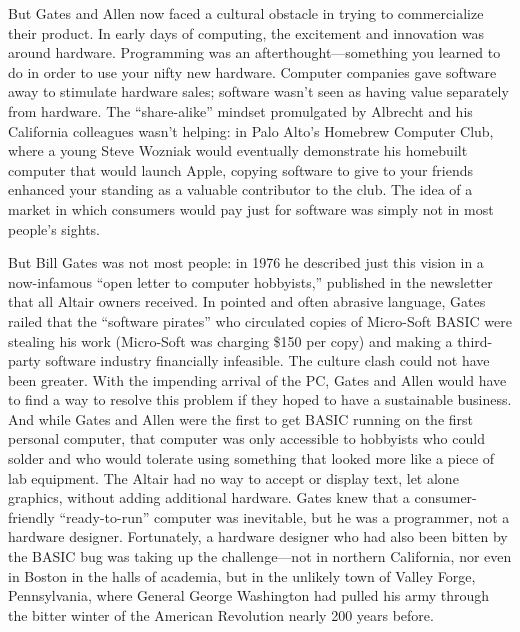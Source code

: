 But Gates and Allen now faced a cultural obstacle in trying to
commercialize their product.
In early days of computing, the excitement and innovation was around
hardware.
Programming was an afterthought---something you learned to do in order
to use your nifty new hardware.
Computer companies gave software away
to stimulate hardware sales; software wasn't seen as having 
value separately from hardware.
The ``share-alike'' mindset promulgated by Albrecht and his California
colleagues wasn't helping: in Palo Alto's Homebrew Computer Club,
where a young Steve Wozniak would eventually demonstrate his homebuilt
computer that would launch Apple, 
copying software to give to your friends
enhanced your standing as a valuable contributor to the club.
The idea of a market in which consumers would pay just for software
was simply not in most people's sights.

But Bill Gates was not most people: in 1976 he described just this
vision in a now-infamous ``open letter
to computer hobbyists,'' published in the newsletter that all
Altair owners received.
In pointed and often abrasive language, Gates railed that the ``software pirates'' who
circulated copies of Micro-Soft BASIC
were stealing his work (Micro-Soft was charging \$150 per copy)
and making a third-party software industry financially
infeasible.
The culture clash could not have been greater.
With the impending arrival of the PC, Gates and Allen would have to
find a way to resolve this problem if they hoped to have a sustainable
business.
And while Gates and Allen were the first to get BASIC running on the first
personal computer, that computer was only accessible to hobbyists
who could solder and who would tolerate using something that looked
more like a piece of lab equipment.
The Altair had no way to accept or display text, let alone graphics,
without adding additional hardware.
Gates knew that a consumer-friendly ``ready-to-run'' computer was inevitable, but he was
a programmer, not a hardware designer.
Fortunately, a hardware designer who had also been bitten by the BASIC
bug was taking up the challenge---not in northern California, nor even
in Boston in the halls of academia, but in the unlikely town of
Valley Forge, Pennsylvania, where General George Washington had pulled
his army through the bitter winter of the American Revolution nearly
200 years before.



